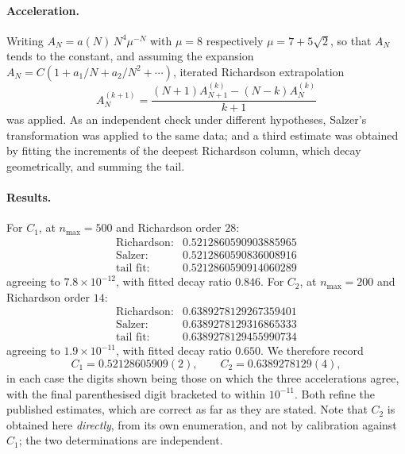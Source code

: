 \documentclass[11pt]{article}
\theoremstyle{definition}
\begin{document}
\paragraph{Acceleration.} Writing $A_N=a(N)\,N^{4}\mu^{-N}$ with $\mu=8$
respectively $\mu=7+5\sqrt2$, so that $A_N$ tends to the constant, and
assuming the expansion $A_N=C(1+a_1/N+a_2/N^{2}+\cdots)$, iterated Richardson
extrapolation
\[
  A^{(k+1)}_N=\frac{(N+1)A^{(k)}_{N+1}-(N-k)A^{(k)}_N}{k+1}
\]
was applied. As an independent check under different hypotheses, Salzer's
transformation was applied to the same data; and a third estimate was obtained
by fitting the increments of the deepest Richardson column, which decay
geometrically, and summing the tail.

\paragraph{Results.} For $C_1$, at $n_{\max}=500$ and Richardson order $28$:
\[
  \begin{array}{ll}
  \text{Richardson:} & 0.5212860590903885965\\
  \text{Salzer:} & 0.5212860590836008916\\
  \text{tail fit:} & 0.5212860590914060289
  \end{array}
\]
agreeing to $7.8\times10^{-12}$, with fitted decay ratio $0.846$. For $C_2$,
at $n_{\max}=200$ and Richardson order $14$:
\[
  \begin{array}{ll}
  \text{Richardson:} & 0.6389278129267359401\\
  \text{Salzer:} & 0.6389278129316865333\\
  \text{tail fit:} & 0.6389278129455990734
  \end{array}
\]
agreeing to $1.9\times10^{-11}$, with fitted decay ratio $0.650$. We therefore
record
\begin{equation}\label{eq:constants}
  C_1=0.52128605909(2),\qquad C_2=0.6389278129(4),
\end{equation}
in each case the digits shown being those on which the three accelerations
agree, with the final parenthesised digit bracketed to within $10^{-11}$.
Both refine the published estimates, which are correct as far as they are
stated. Note that $C_2$ is obtained here \emph{directly}, from its own
enumeration, and not by calibration against $C_1$; the two determinations are
independent.
\end{document}
